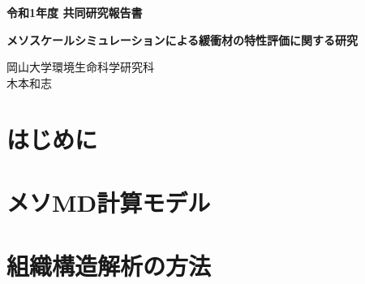 ﻿\documentclass[11pt,a4j]{jarticle}
\newlength{\minitwocolumn}
\begin{document}
\newcommand{\fat}[1]{\mbox{\boldmath $#1$}}
\newcommand{\D}{\partial}
\newcommand{\w}{\omega}
\newcommand{\ga}{\alpha}
\newcommand{\gb}{\beta}
\newcommand{\gx}{\xi}
\newcommand{\gz}{\zeta}
\newcommand{\vhat}[1]{\hat{\fat{#1}}}
\newcommand{\spc}{\vspace{0.7\baselineskip}}
\newcommand{\halfspc}{\vspace{0.3\baselineskip}}

\newcommand{\twofig}[2]
 {
   \begin{figure}[h]
     \begin{minipage}[t]{\minitwocolumn}
         \begin{center}   #1
         \end{center}
     \end{minipage}
         \hspace{\columnsep}
     \begin{minipage}[t]{\minitwocolumn}
         \begin{center} #2
         \end{center}
     \end{minipage}
   \end{figure}
 }
\begin{center}
{\Large \bf 令和1年度 共同研究報告書}
\end{center}
\vspace{2mm}
\begin{center}
{\LARGE \bf 
メソスケールシミュレーションによる緩衝材の特性評価に関する研究} 
\end{center}
\begin{center}
岡山大学環境生命科学研究科\\
木本和志
\end{center}
\vspace{10mm}
\section{はじめに}

\section{メソMD計算モデル}

\section{組織構造解析の方法}

\end{document}
